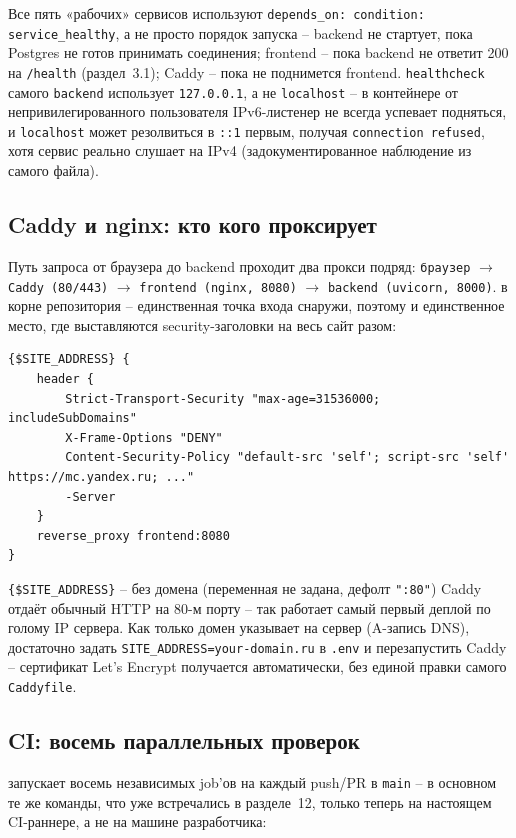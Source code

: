 Все пять «рабочих» сервисов используют \texttt{depends_on:
condition: service_healthy}, а не просто порядок запуска -- backend
не стартует, пока Postgres не готов принимать соединения;
frontend -- пока backend не ответит 200 на \texttt{/health} (раздел~3.1);
Caddy -- пока не поднимется frontend. \texttt{healthcheck} самого
\texttt{backend} использует \texttt{127.0.0.1}, а не \texttt{localhost} --
в контейнере от непривилегированного пользователя IPv6-листенер не
всегда успевает подняться, и \texttt{localhost} может резолвиться в
\texttt{::1} первым, получая \texttt{connection refused}, хотя сервис
реально слушает на IPv4 (задокументированное наблюдение из самого файла).

\subsection{Caddy и nginx: кто кого проксирует}

Путь запроса от браузера до backend проходит два прокси подряд:
\texttt{браузер} $\to$ \texttt{Caddy (80/443)} $\to$
\texttt{frontend (nginx, 8080)} $\to$ \texttt{backend (uvicorn, 8000)}.
 в корне репозитория -- единственная точка входа
снаружи, поэтому и единственное место, где выставляются
security-заголовки на весь сайт разом:
\begin{verbatim}
{$SITE_ADDRESS} {
    header {
        Strict-Transport-Security "max-age=31536000; includeSubDomains"
        X-Frame-Options "DENY"
        Content-Security-Policy "default-src 'self'; script-src 'self' https://mc.yandex.ru; ..."
        -Server
    }
    reverse_proxy frontend:8080
}
\end{verbatim}
\texttt{\{\$SITE_ADDRESS\}} -- без домена (переменная не задана,
дефолт \texttt{":80"}) Caddy отдаёт обычный HTTP на 80-м порту -- так
работает самый первый деплой по голому IP сервера. Как только домен
указывает на сервер (A-запись DNS), достаточно задать
\texttt{SITE_ADDRESS=your-domain.ru} в \texttt{.env} и перезапустить
Caddy -- сертификат Let's Encrypt получается автоматически, без единой
правки самого \texttt{Caddyfile}.

\subsection{CI: восемь параллельных проверок}

 запускает восемь независимых job'ов на
каждый push/PR в \texttt{main} -- в основном те же команды, что уже
встречались в разделе~12, только теперь на настоящем CI-раннере, а не на
машине разработчика:

